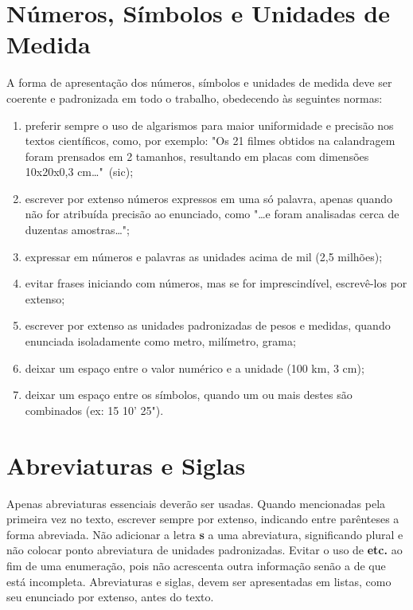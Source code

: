 \documentclass[repeatfields,xlists,xpacks,oneside]{ufrgscca}
\begin{document}
\begin{annex}
\section{Números, Símbolos e Unidades de Medida}

A forma de apresentação dos números, símbolos e unidades de medida deve ser
coerente e padronizada em todo o trabalho, obedecendo às seguintes normas:

\begin{enumerate}

\item preferir sempre o uso de algarismos para maior uniformidade e precisão
nos textos científicos, como, por exemplo: "Os 21 filmes obtidos na
calandragem foram prensados em 2 tamanhos, resultando em placas com
dimensões 10x20x0,3 cm\ldots"\ (sic);

\item escrever por extenso números expressos em uma só palavra, apenas
quando não for atribuída precisão ao enunciado, como "\ldots e foram analisadas
cerca de duzentas amostras\ldots";

\item expressar em números e palavras as unidades acima de mil (2,5
milhões);

\item evitar frases iniciando com números, mas se for imprescindível,
escrevê-los por extenso;

\item escrever por extenso as unidades padronizadas de pesos e medidas,
quando enunciada isoladamente como metro, milímetro, grama;

\item deixar um espaço entre o valor numérico e a unidade (100 km, 3 cm);

\item deixar um espaço entre os símbolos, quando um ou mais destes são
combinados (ex: 15  10' 25").

\end{enumerate}

\section{Abreviaturas e Siglas}

Apenas abreviaturas essenciais deverão ser usadas. Quando mencionadas pela
primeira vez no texto, escrever sempre por extenso, indicando entre
parênteses a forma abreviada. Não adicionar a letra {\bf s} a uma abreviatura,
significando plural e não colocar ponto abreviatura de unidades
padronizadas. Evitar o uso de {\bf etc.} ao fim de uma enumeração, pois não
acrescenta outra informação senão a de que está incompleta. Abreviaturas e
siglas, devem ser apresentadas em listas, como seu enunciado por extenso,
antes do texto.

\end{annex}
\end{document}
